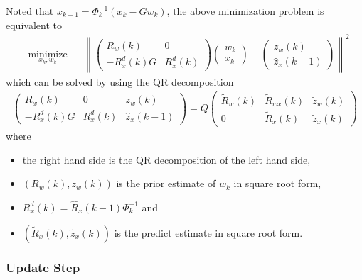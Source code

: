 \documentclass[microtype]{gtpart}     %
\theoremstyle{definition}
\newcommand{\norm}[1]{\left\lVert#1\right\rVert}
\begin{document}
Noted that $x_{k-1} = \Phi^{-1}_k(x_k - Gw_k)$, the above minimization problem is equivalent to
\begin{align*}
	& \underset{x_k, w_k}{\text{minimize}} & &\norm{
		\begin{pmatrix}
		R_w(k) &0 \\
		-R^d_x(k)G &R^d_x(k)
		\end{pmatrix}
		\begin{pmatrix}
		w_k \\ x_k
		\end{pmatrix} - \begin{pmatrix}
		z_w(k) \\ \hat{z}_x(k-1)
		\end{pmatrix}}^2
\end{align*}
which can be solved by using the QR decomposition
\begin{align*}
	\begin{pmatrix}
		R_w(k) &0 &z_w(k) \\ 
		-R^d_x(k)G &R^d_x(k) &\hat{z}_x(k-1)
	\end{pmatrix} = Q
	\begin{pmatrix}
		\tilde{R}_w(k) &\tilde{R}_{wx}(k) &\tilde{z}_w(k) \\ 0 &\tilde{R}_x(k) &\tilde{z}_x(k)
	\end{pmatrix}
\end{align*}
where
\begin{itemize}
	\item the right hand side is the QR decomposition of the left hand side,
	\item $(R_w(k), z_w(k))$ is the prior estimate of $w_k$ in square root form,
	\item $R^d_x(k)=\hat{R}_x(k-1)\Phi^{-1}_k$ and
	\item $(\tilde{R}_x(k), \tilde{z}_x(k))$ is the predict estimate in square root form.
\end{itemize}

\subsubsection{Update Step}
\end{document}
